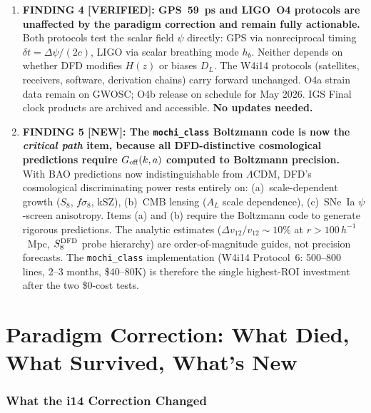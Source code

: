 \documentclass[11pt]{article}
\newcommand{\LCDM}{\Lambda\text{CDM}}
\newcommand{\Geff}{G_{\rm eff}}
\begin{document}
\begin{tcolorbox}[colback=blue!5!white, colframe=blue!60!black,
  title=\textbf{W4i15 TOP 5 FINDINGS --- Ranked by Programme Impact}]
\begin{enumerate}
\item \textbf{FINDING 4 [VERIFIED]: GPS~59~ps and LIGO~O4 protocols
are unaffected by the paradigm correction and remain fully actionable.}
Both protocols test the scalar field $\psi$ directly:
GPS via nonreciprocal timing $\delta t = \Delta\psi/(2c)$,
LIGO via scalar breathing mode $h_b$. Neither depends on
whether DFD modifies $H(z)$ or biases $D_L$. The W4i14 protocols
(satellites, receivers, software, derivation chains) carry forward
unchanged. O4a strain data remain on GWOSC; O4b release on schedule
for May 2026. IGS Final clock products are archived and accessible.
\textbf{No updates needed.}

\item \textbf{FINDING 5 [NEW]: The \texttt{mochi\_class} Boltzmann
code is now the \emph{critical path} item, because all DFD-distinctive
cosmological predictions require $\Geff(k,a)$ computed to Boltzmann
precision.}
With BAO predictions now indistinguishable from $\LCDM$, DFD's
cosmological discriminating power rests entirely on:
(a)~scale-dependent growth ($S_8$, $f\sigma_8$, kSZ),
(b)~CMB lensing ($A_L$ scale dependence),
(c)~SNe~Ia $\psi$-screen anisotropy.
Items (a) and (b) require the Boltzmann code to generate rigorous
predictions. The analytic estimates ($\Delta v_{12}/v_{12} \sim 10\%$
at $r > 100\,h^{-1}$~Mpc, $S_8^{\rm DFD}$ probe hierarchy) are
order-of-magnitude guides, not precision forecasts. The
\texttt{mochi\_class} implementation (W4i14 Protocol~6: 500--800
lines, 2--3 months, \$40--80K) is therefore the single highest-ROI
investment after the two \$0-cost tests.

\end{enumerate}
\end{tcolorbox}

\tableofcontents
\newpage


\part{Paradigm Correction: What Died, What Survived, What's New}
\label{part:paradigm}

\section{What the i14 Correction Changed}
\end{document}
